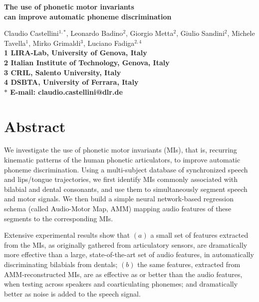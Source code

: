 \documentclass[10pt]{article}
\date{}
\begin{document}
\begin{flushleft}
{\Large
\textbf{The use of phonetic motor invariants\\
can improve automatic phoneme discrimination}
}



Claudio Castellini$^{1,\ast}$,
Leonardo Badino$^{2}$,
Giorgio Metta$^{2}$,
Giulio Sandini$^{2}$,
Michele Tavella$^{1}$,
Mirko Grimaldi$^{3}$,
Luciano Fadiga$^{2,4}$
\\ 
\bf{1} LIRA-Lab, University of Genova, Italy
\\
\bf{2} Italian Institute of Technology, Genova, Italy
\\
\bf{3} CRIL, Salento University, Italy
\\
\bf{4} DSBTA, University of Ferrara, Italy
\\
$\ast$ E-mail: claudio.castellini@dlr.de
\end{flushleft}

\section*{Abstract}

 We investigate the use of phonetic motor invariants (MIs),
  that is, recurring kinematic patterns of the human phonetic articulators,
  to improve automatic phoneme discrimination. Using a multi-subject
  database of synchronized speech and lips/tongue trajectories, we first
  identify MIs commonly associated with bilabial and dental consonants,
  and use them to simultaneously segment speech and motor signals.
  We then build a simple neural network-based regression schema (called Audio-Motor
  Map, AMM) mapping audio features of these segments to the corresponding
  MIs.
  
  Extensive experimental results show that
  $(a)$ a small set of features extracted from the MIs, as originally gathered from
    articulatory sensors, are dramatically more effective than a large, state-of-the-art
    set of audio features, in automatically discriminating bilabials from dentals;
  $(b)$ the same features, extracted from AMM-reconstructed MIs, are as effective as
  or better than the audio features, when testing across speakers and coarticulating phonemes;
    and dramatically better as noise is added to the speech signal.
  
\end{document}

